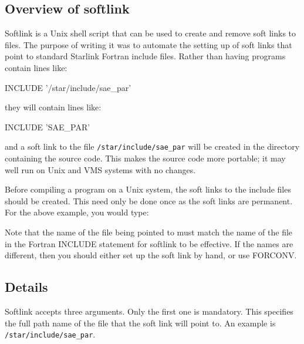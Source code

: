 \documentclass[11pt,nolof]{starlink}
\begin{document}
\subsection{Overview of softlink}

Softlink is a Unix shell script that can be used to create and remove soft
links to files. The purpose of writing it was to automate the setting up of
soft links that point to standard Starlink Fortran include files.  Rather than
having programs contain lines like:

\begin{terminalv}
INCLUDE '/star/include/sae_par'
\end{terminalv}

they will contain lines like:

\begin{terminalv}
INCLUDE 'SAE_PAR'
\end{terminalv}

and a soft link to the file \texttt{/star/include/sae\_par} will be created in the
directory containing the source code. This makes the source code more portable;
it may well run on Unix and VMS systems with no changes.

Before compiling a program on a Unix system, the soft links to the include
files should be created. This need only be done once as the soft links are
permanent. For the above example, you would type:

\begin{terminalv}
\end{terminalv}

Note that the name of the file being pointed to must match the name of the file
in the Fortran INCLUDE statement for softlink to be effective. If the names are
different, then you should either set up the soft link by hand, or use FORCONV.

\subsection{Details}

Softlink accepts three arguments. Only the first one is mandatory. This
specifies the full path name of the file that the soft link will point to.
An example is \texttt{/star/include/sae\_par}.
\end{document}
